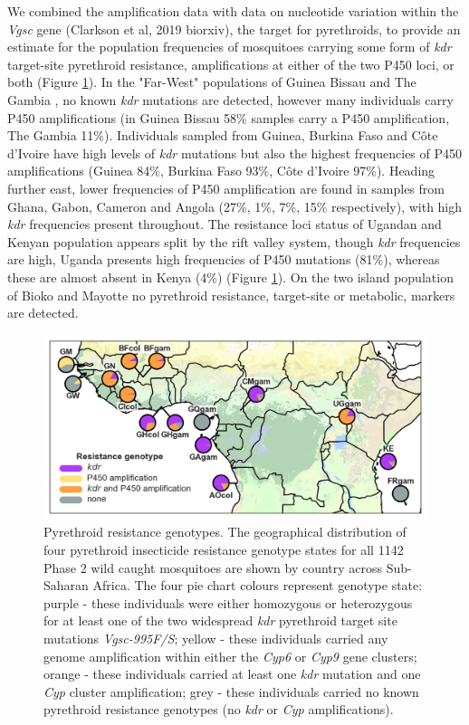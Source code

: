 \documentclass[a4paper,11pt,abstracton,hidelinks]{scrartcl}
\begin{document}
We combined the amplification data with data on nucleotide variation within the \textit{Vgsc} gene (Clarkson et al, 2019 biorxiv), the target for pyrethroids, to provide an estimate for the population frequencies of mosquitoes carrying some form of \textit{kdr} target-site pyrethroid resistance, amplifications at either of the two P450 loci, or both (Figure \ref{ir}). 
%
In the "Far-West" populations of Guinea Bissau and The Gambia \cite{caputo2011}, no known \textit{kdr} mutations are detected, however many individuals carry P450 amplifications (in Guinea Bissau 58\% samples carry a P450 amplification, The Gambia 11\%).
%
Individuals sampled from Guinea, Burkina Faso and C\^{o}te d'Ivoire have high levels of \textit{kdr} mutations but also the highest frequencies of P450 amplifications (Guinea 84\%, Burkina Faso 93\%, C\^{o}te d'Ivoire 97\%).
%
Heading further east, lower frequencies of P450 amplification are found in samples from Ghana, Gabon, Cameron and Angola (27\%, 1\%, 7\%, 15\% respectively), with high \textit{kdr} frequencies present throughout.
%
The resistance loci status of Ugandan and Kenyan population appears split by the rift valley system, though \textit{kdr} frequencies are high, Uganda presents high frequencies of P450 mutations (81\%), whereas these are almost absent in Kenya (4\%) (Figure \ref{ir}).
%
On the two island population of Bioko and Mayotte no pyrethroid resistance, target-site or metabolic, markers are detected.


\begin{figure}[H]
	\begin{center}
		\includegraphics*[width=6.3in]{artwork/pyrethroid_resistance_simplified.jpg}
	\end{center}
	\caption{Pyrethroid resistance genotypes. The geographical distribution of four pyrethroid insecticide resistance genotype states for all 1142 Phase 2 wild caught mosquitoes are shown by country across Sub-Saharan Africa. The four pie chart colours represent genotype state: purple - these individuals were either homozygous or heterozygous for at least one of the two widespread \textit{kdr} pyrethroid target site mutations \textit{Vgsc-995F/S}; yellow - these individuals carried any genome amplification within either the \textit{Cyp6} or \textit{Cyp9} gene clusters; orange - these individuals carried at least one \textit{kdr} mutation and one \textit{Cyp} cluster amplification; grey - these individuals carried no known pyrethroid resistance genotypes (no \textit{kdr} or \textit{Cyp} amplifications).}
	\label{ir}
\end{figure}
\end{document}
